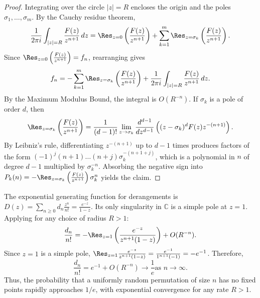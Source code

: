 \begin{proof}
    Integrating over the circle \(|z| = R\) encloses the origin and the poles \(\sigma_1, \dots, \sigma_m\).
    By the Cauchy residue theorem,
    \[
        \frac{1}{2\pi i} \int_{|z| = R} \frac{F(z)}{z^{n+1}} \, dz = \Res_{z = 0} \left( \frac{F(z)}{z^{n+1}} \right) + \sum_{k=1}^m \Res_{z = \sigma_k} \left( \frac{F(z)}{z^{n+1}} \right).
    \]
    Since \(\Res_{z=0} \left( \frac{F(z)}{z^{n+1}} \right) = f_n\), rearranging gives
    \[
        f_n = - \sum_{k=1}^m \Res_{z = \sigma_k} \left( \frac{F(z)}{z^{n+1}} \right) + \frac{1}{2\pi i} \int_{|z| = R} \frac{F(z)}{z^{n+1}} \, dz.
    \]
    By the Maximum Modulus Bound, the integral is \(O(R^{-n})\).
    If \(\sigma_k\) is a pole of order \(d\), then
    \[
        \Res_{z = \sigma_k} \left( \frac{F(z)}{z^{n+1}} \right) = \frac{1}{(d-1)!} \lim_{z \to \sigma_k} \frac{d^{d-1}}{dz^{d-1}} \left( (z - \sigma_k)^d F(z) z^{-(n+1)} \right).
    \]
    By Leibniz's rule, differentiating \(z^{-(n+1)}\) up to \(d-1\) times produces factors of the form \((-1)^j (n+1)\dots(n+j) \sigma_k^{-(n+1+j)}\), which is a polynomial in \(n\) of degree \(d-1\) multiplied by \(\sigma_k^{-n}\).
    Absorbing the negative sign into \(P_k(n) = -\Res_{z=\sigma_k} \left( \frac{F(z)}{z^{n+1}} \right) \sigma_k^n\) yields the claim.
\end{proof}

\begin{example}[Derangements]
    The exponential generating function for derangements is \(D(z) = \sum_{n \ge 0} d_n \frac{z^n}{n!} = \frac{e^{-z}}{1 - z}\).
    Its only singularity in \(\mathbb{C}\) is a simple pole at \(z = 1\).
    Applying  for any choice of radius \(R > 1\):
    \[
        \frac{d_n}{n!} = - \Res_{z = 1} \left( \frac{e^{-z}}{z^{n+1}(1 - z)} \right) + O(R^{-n}).
    \]
    Since \(z = 1\) is a simple pole, \(\Res_{z=1} \frac{e^{-z}}{z^{n+1}(1-z)} = \frac{e^{-1}}{1^{n+1}(-1)} = -e^{-1}\).
    Therefore,
    \[
        \frac{d_n}{n!} = e^{-1} + O(R^{-n}) \to \frac{1}{e} \text{as } n \to \infty.
    \]
    Thus, the probability that a uniformly random permutation of size \(n\) has no fixed points rapidly approaches \(1/e\), with exponential convergence for any rate \(R > 1\).
\end{example}